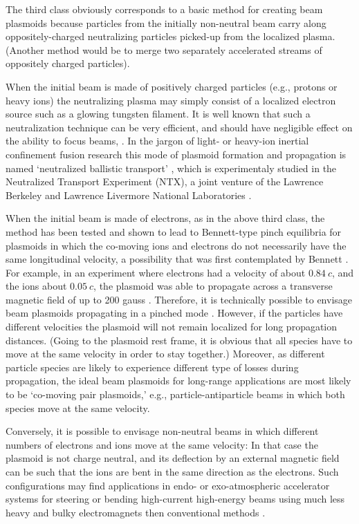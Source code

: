 \documentclass [12pt,a4paper,     ]{report} %
\begin{document}
   The third class obviously corresponds to a basic method for creating beam plasmoids because particles from the initially non-neutral beam carry along oppositely-charged neutralizing particles picked-up from the localized plasma.  (Another method would be to merge two separately accelerated streams of oppositely charged particles).

   When the initial beam is made of positively charged particles (e.g., protons or heavy ions) the neutralizing plasma may simply consist of a localized electron source such as a glowing tungsten filament.  It is well known that such a neutralization technique can be very efficient, and should have negligible effect on the ability to focus beams, \cite{DOLIQ1979-, HUMPH1981-, LEMON1981-}.  In the jargon of light- or heavy-ion inertial confinement fusion research this mode of plasmoid formation and propagation is named `neutralized ballistic transport' \cite{ROSE-2001A}, which is experimentaly studied in the Neutralized Transport Experiment (NTX), a joint venture of the Lawrence Berkeley and Lawrence Livermore National Laboratories \cite{ROY--2004-}.


   When the initial beam is made of electrons, as in the above third class, the method has been tested and shown to lead to Bennett-type pinch equilibria for plasmoids in which the co-moving ions and electrons do not necessarily have the same longitudinal velocity, a possibility that was first contemplated by Bennett \cite{BENNE1955-}.  For example, in an experiment where electrons had a velocity of about $0.84~c$, and the ions about $0.05~c$, the plasmoid was able to propagate across a transverse magnetic field of up to 200 gauss \cite{ZHANG1989-}.  Therefore, it is technically possible to envisage beam plasmoids propagating in a pinched mode \cite[p.188]{DESTL1988-}.  However, if the particles have different velocities the plasmoid will not remain localized for long propagation distances.  (Going to the plasmoid rest frame, it is obvious that all species have to move at the same velocity in order to stay together.)  Moreover, as different particle species are likely to experience different type of losses during propagation, the ideal beam plasmoids for long-range applications are most likely to be `co-moving pair plasmoids,' e.g., particle-antiparticle beams in which both species move at the same velocity.

    Conversely, it is possible to envisage non-neutral beams in which different numbers of electrons and ions move at the same velocity:  In that case the plasmoid is not charge neutral, and its deflection by an external magnetic field can be such that the ions are bent in the same direction as the electrons.  Such configurations may find applications in endo- or exo-atmospheric accelerator systems for steering or bending high-current high-energy beams using much less heavy and bulky electromagnets then conventional methods \cite{NGUYE1985-}.
\end{document}
